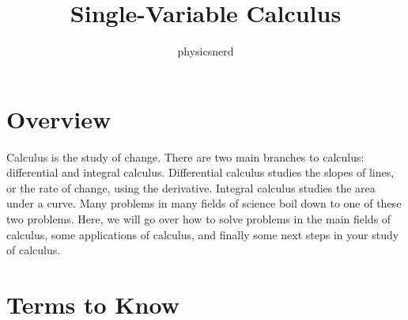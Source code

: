 \documentclass[12pt]{article}
\title{Single-Variable Calculus}
\author{physicsnerd}
\begin{document}
\maketitle
\tableofcontents

\section{Overview}
Calculus is the study of change. 
There are two main branches to calculus: differential and integral calculus. 
Differential calculus studies the slopes of lines, or the rate of change, using the derivative. 
Integral calculus studies the area under a curve. 
Many problems in many fields of science boil down to one of these two problems. 
Here, we will go over how to solve problems in the main fields of calculus, some applications of calculus, and finally some next steps in your study of calculus.

\section{Terms to Know}
\end{document}
